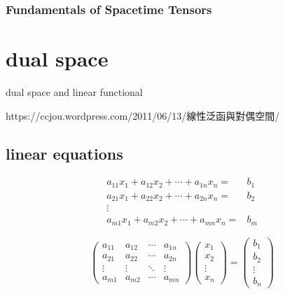 \documentclass[
]{book}
\theoremstyle{definition}
\theoremstyle{definition}
\theoremstyle{definition}
\theoremstyle{definition}
\theoremstyle{remark}
\begin{document}
\subsection{Fundamentals of Spacetime Tensors}\label{fundamentals-of-spacetime-tensors}

\chapter{dual space}\label{dual-space}

dual space and linear functional

\begin{CJK}{UTF8}{bsmi}
https://ccjou.wordpress.com/2011/06/13/線性泛函與對偶空間/
\end{CJK}

\section{linear equations}\label{linear-equations}

\[
\begin{aligned}
a_{{\scriptscriptstyle 11}}x_{{\scriptscriptstyle 1}}+a_{{\scriptscriptstyle 12}}x_{{\scriptscriptstyle 2}}+\cdots+a_{{\scriptscriptstyle 1n}}x_{{\scriptscriptstyle n}}= & b_{{\scriptscriptstyle 1}}\\
a_{{\scriptscriptstyle 21}}x_{{\scriptscriptstyle 1}}+a_{{\scriptscriptstyle 22}}x_{{\scriptscriptstyle 2}}+\cdots+a_{{\scriptscriptstyle 2n}}x_{{\scriptscriptstyle n}}= & b_{{\scriptscriptstyle 2}}\\
\vdots\\
a_{{\scriptscriptstyle m1}}x_{{\scriptscriptstyle 1}}+a_{{\scriptscriptstyle m2}}x_{{\scriptscriptstyle 2}}+\cdots+a_{{\scriptscriptstyle mn}}x_{{\scriptscriptstyle n}}= & b_{{\scriptscriptstyle m}}
\end{aligned}
\]

\[
\begin{pmatrix}a_{{\scriptscriptstyle 11}} & a_{{\scriptscriptstyle 12}} & \cdots & a_{{\scriptscriptstyle 1n}}\\
a_{{\scriptscriptstyle 21}} & a_{{\scriptscriptstyle 22}} & \cdots & a_{{\scriptscriptstyle 2n}}\\
\vdots & \vdots & \ddots & \vdots\\
a_{{\scriptscriptstyle m1}} & a_{{\scriptscriptstyle m2}} & \cdots & a_{{\scriptscriptstyle mn}}
\end{pmatrix}\begin{pmatrix}x_{{\scriptscriptstyle 1}}\\
x_{{\scriptscriptstyle 2}}\\
\vdots\\
x_{{\scriptscriptstyle n}}
\end{pmatrix}=\begin{pmatrix}b_{{\scriptscriptstyle 1}}\\
b_{{\scriptscriptstyle 2}}\\
\vdots\\
b_{{\scriptscriptstyle n}}
\end{pmatrix}
\]
\end{document}

